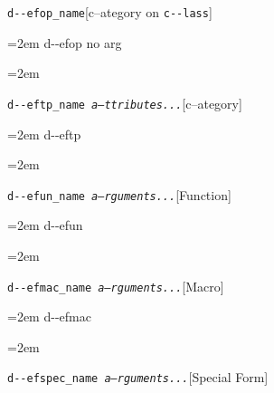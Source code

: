 \documentclass{book}
\begin{document}
\endgroup{}%
\noindent\texttt{d{-}{-}efop\_name}\hfill[c--ategory on \texttt{c{-}{-}lass}]



%
\par\begingroup\obeylines\obeyspaces\frenchspacing\leftskip=2em\relax\parskip=0pt\relax\ttfamily{}%
d{-}{-}efop no arg
\endgroup{}%
\par\begingroup\obeylines\obeyspaces\frenchspacing\leftskip=2em\relax\parskip=0pt\relax\ttfamily{}%

\endgroup{}%
\noindent\texttt{d{-}{-}eftp\_name \bgroup{}\normalfont{}\textsl{a--ttributes...}\egroup{}}\hfill[c--ategory]



%
\par\begingroup\obeylines\obeyspaces\frenchspacing\leftskip=2em\relax\parskip=0pt\relax\ttfamily{}%
d{-}{-}eftp
\endgroup{}%
\par\begingroup\obeylines\obeyspaces\frenchspacing\leftskip=2em\relax\parskip=0pt\relax\ttfamily{}%

\endgroup{}%
\noindent\texttt{d{-}{-}efun\_name \bgroup{}\normalfont{}\textsl{a--rguments...}\egroup{}}\hfill[Function]



%
\par\begingroup\obeylines\obeyspaces\frenchspacing\leftskip=2em\relax\parskip=0pt\relax\ttfamily{}%
d{-}{-}efun
\endgroup{}%
\par\begingroup\obeylines\obeyspaces\frenchspacing\leftskip=2em\relax\parskip=0pt\relax\ttfamily{}%

\endgroup{}%
\noindent\texttt{d{-}{-}efmac\_name \bgroup{}\normalfont{}\textsl{a--rguments...}\egroup{}}\hfill[Macro]



%
\par\begingroup\obeylines\obeyspaces\frenchspacing\leftskip=2em\relax\parskip=0pt\relax\ttfamily{}%
d{-}{-}efmac
\endgroup{}%
\par\begingroup\obeylines\obeyspaces\frenchspacing\leftskip=2em\relax\parskip=0pt\relax\ttfamily{}%

\endgroup{}%
\noindent\texttt{d{-}{-}efspec\_name \bgroup{}\normalfont{}\textsl{a--rguments...}\egroup{}}\hfill[Special Form]
\end{document}
